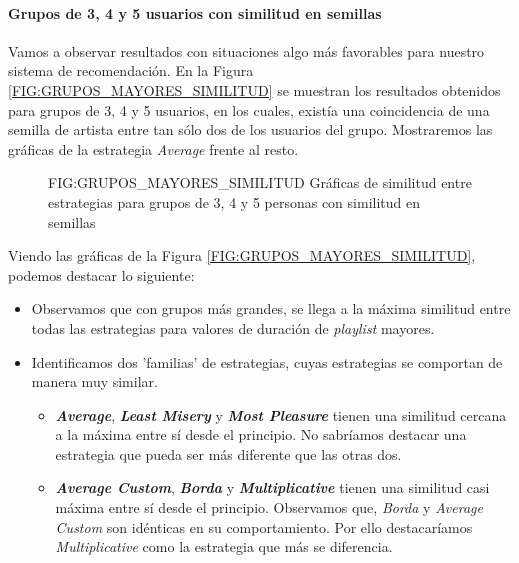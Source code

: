 \paragraph{Grupos de 3, 4 y 5 usuarios con similitud en semillas}

Vamos a observar resultados con situaciones algo más favorables para nuestro sistema de recomendación. En la Figura \ref{FIG:GRUPOS_MAYORES_SIMILITUD}
se muestran los resultados obtenidos para grupos de 3, 4 y 5 usuarios, en los cuales, existía una coincidencia de una semilla de artista entre tan sólo
dos de los usuarios del grupo. Mostraremos las gráficas de la estrategia \textit{Average} frente al resto.

\begin{figure}[Gráficas de similitud entre estrategias para grupos de 3, 4 y 5 personas con similitud en semillas]{FIG:GRUPOS_MAYORES_SIMILITUD}
    {Gráficas de similitud entre estrategias para grupos de 3, 4 y 5 personas con similitud en semillas}
\end{figure}

Viendo las gráficas de la Figura \ref{FIG:GRUPOS_MAYORES_SIMILITUD}, podemos destacar lo siguiente:

\begin{itemize}
    \item Observamos que con grupos más grandes, se llega a la máxima similitud entre todas las estrategias para valores de duración de \textit{playlist} mayores. 
    \item Identificamos dos 'familias' de estrategias, cuyas estrategias se comportan de manera muy similar.
    \begin{itemize}
        \item \textbf{\textit{Average}}, \textbf{\textit{Least Misery}} y \textbf{\textit{Most Pleasure}} tienen una similitud cercana a la máxima entre sí desde el principio. No sabríamos
        destacar una estrategia que pueda ser más diferente que las otras dos.
        \item \textbf{\textit{Average Custom}}, \textbf{\textit{Borda}} y \textbf{\textit{Multiplicative}} tienen una similitud casi máxima entre sí desde el principio. Observamos que,
        \textit{Borda} y \textit{Average Custom} son idénticas en su comportamiento. Por ello destacaríamos \textit{Multiplicative} como la estrategia que más se diferencia.
    \end{itemize}
\end{itemize}

